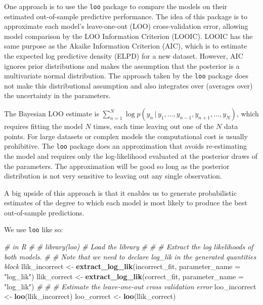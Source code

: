 \documentclass[]{book}
\newenvironment{Shaded}{\begin{snugshade}}{\end{snugshade}}
\newcommand{\KeywordTok}[1]{\textcolor[rgb]{0.13,0.29,0.53}{\textbf{{#1}}}}
\newcommand{\DataTypeTok}[1]{\textcolor[rgb]{0.13,0.29,0.53}{{#1}}}
\newcommand{\StringTok}[1]{\textcolor[rgb]{0.31,0.60,0.02}{{#1}}}
\newcommand{\CommentTok}[1]{\textcolor[rgb]{0.56,0.35,0.01}{\textit{{#1}}}}
\newcommand{\NormalTok}[1]{{#1}}
\begin{document}
One approach is to use the \texttt{loo} package to compare the models on
their estimated out-of-sample predictive performance. The idea of this
package is to approximate each model's leave-one-out (LOO)
cross-validation error, allowing model comparison by the LOO Information
Criterion (LOOIC). LOOIC has the same purpose as the Akaike Information
Criterion (AIC), which is to estimate the expected log predictive
density (ELPD) for a new dataset. However, AIC ignores prior
distributions and makes the assumption that the posterior is a
multivariate normal distribution. The approach taken by the \texttt{loo}
package does not make this distributional assumption and also integrates
over (averages over) the uncertainty in the parameters.

The Bayesian LOO estimate is
\(\sum_{n = 1}^{N}\log p(y_{n} \, | \, y_{1}, ..., y_{n-1}, y_{n+1}, ..., y_{N})\),
which requires fitting the model \(N\) times, each time leaving out one
of the \(N\) data points. For large datasets or complex models the
computational cost is usually prohibitive. The \texttt{loo} package does
an approximation that avoids re-estimating the model and requires only
the log-likelihood evaluated at the posterior draws of the parameters.
The approximation will be good so long as the posterior distribution is
not very sensitive to leaving out any single observation.

A big upside of this approach is that it enables us to generate
probabilistic estimates of the degree to which each model is most likely
to produce the best out-of-sample predictions.

We use \texttt{loo} like so:

\begin{Shaded}
\begin{Highlighting}[]
\CommentTok{# in R}
\CommentTok{# }
\CommentTok{# library(loo) # Load the library}
\CommentTok{# }
\CommentTok{# # Extract the log likelihoods of both models.}
\CommentTok{# # Note that we need to declare log_lik in the generated quantities block}
\NormalTok{llik_incorrect <-}\StringTok{ }\KeywordTok{extract_log_lik}\NormalTok{(incorrect_fit, }\DataTypeTok{parameter_name =} \StringTok{"log_lik"}\NormalTok{)}
\NormalTok{llik_correct <-}\StringTok{ }\KeywordTok{extract_log_lik}\NormalTok{(correct_fit, }\DataTypeTok{parameter_name =} \StringTok{"log_lik"}\NormalTok{)}
\CommentTok{# }
\CommentTok{# # Estimate the leave-one-out cross validation error}
\NormalTok{loo_incorrect <-}\StringTok{ }\KeywordTok{loo}\NormalTok{(llik_incorrect)}
\NormalTok{loo_correct <-}\StringTok{ }\KeywordTok{loo}\NormalTok{(llik_correct)}
\end{Highlighting}
\end{Shaded}
\end{document}
